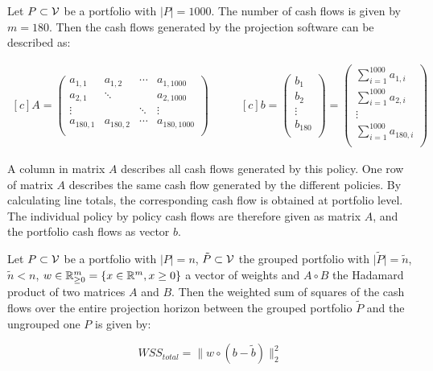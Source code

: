 \begin{example}
	Let $P \subset \mathcal{V}$ be a portfolio with $\vert P \vert = 1000$. The number of cash flows is given by $m = 180$. Then the cash flows generated by the projection software can be described as:
	
	\begin{equation*}
	\begin{aligned}[c]	
		A= 
		\left( 
			\begin{array}{cccc}
				a_{1,1} 	& a_{1,2} 	& \cdots 	& a_{1,1000} \\
				a_{2,1} 	& \ddots	&  			& a_{2,1000} \\
				\vdots 		&  			& \ddots 	& \vdots \\
				a_{180,1} 	& a_{180,2}	& \cdots 	& a_{180,1000} \\
			\end{array}
		\right)	
	\end{aligned}
	\qquad
	\begin{aligned}[c]
		b = 
		\left( 
			\begin{array}{c}
			b_{1} \\
			b_{2}\\
			\vdots\\
			b_{180}\\
			\end{array}
		\right)	
		=
		\left( 
			\begin{array}{c}
			\sum_{i = 1}^{1000} a_{1,i} \\
			\sum_{i = 1}^{1000} a_{2,i}\\
			\vdots\\
			\sum_{i = 1}^{1000} a_{180,i}\\
			\end{array}
		\right)	
	\end{aligned}	
	\end{equation*}
\end{example}

A column in matrix $A$ describes all cash flows generated by this policy. One row of matrix $A$ describes the same cash flow generated by the different policies. By calculating line totals, the corresponding cash flow is obtained at portfolio level. The individual policy by policy cash flows are therefore given as matrix $A$, and the portfolio cash flows as vector $b$. 

\begin{definition}
	Let $P \subset \mathcal{V}$ be a portfolio with $\vert P \vert = n$, $\tilde{P} \subset \mathcal{V}$  the grouped portfolio with $\vert \tilde{P} \vert = \tilde{n}$, $\tilde{n} < n$, $w \in \mathbb{R}^m_{\geq 0} = \{x \in \mathbb{R}^m, x \geq 0\}$ a vector of weights and $A \circ B$ the Hadamard product of two matrices $A$ and $B$. Then the weighted sum of squares of the cash flows over the entire projection horizon between the grouped portfolio $\tilde{P}$ and the ungrouped one $P$ is given by: 
	
	\begin{equation}\label{eq:objective_function}
		WSS_{total} = \lVert w \circ (b - \tilde{b})\lVert_2^2
	\end{equation}
\end{definition}

